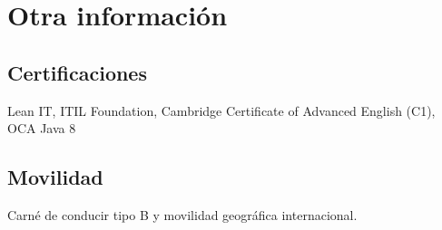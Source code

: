 \documentclass[letterpaper]{twentysecondcv} %
\begin{document}

\section{Otra información}
\subsection{Certificaciones}
Lean IT, ITIL Foundation, Cambridge Certificate of Advanced English (C1), OCA Java 8
\subsection{Movilidad}
Carné de conducir tipo B y movilidad geográfica internacional.







\end{document}

